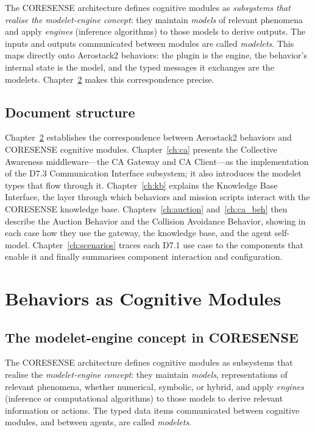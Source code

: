 \documentclass[deliverable]{csreport}
\begin{document}
The CORESENSE architecture defines cognitive modules as \emph{subsystems that realise the modelet-engine concept}: they maintain \emph{models} of relevant phenomena and apply \emph{engines} (inference algorithms) to those models to derive outputs. The inputs and outputs communicated between modules are called \emph{modelets}. This maps directly onto Aerostack2 behaviors: the plugin is the engine, the behavior's internal state is the model, and the typed messages it exchanges are the modelets. Chapter~\ref{ch:cognitive} makes this correspondence precise.

\section{Document structure}

Chapter~\ref{ch:cognitive} establishes the correspondence between Aerostack2 behaviors and CORESENSE cognitive modules. Chapter~\ref{ch:ca} presents the Collective Awareness middleware---the CA Gateway and CA Client---as the implementation of the D7.3 Communication Interface subsystem; it also introduces the modelet types that flow through it. Chapter~\ref{ch:kb} explains the Knowledge Base Interface, the layer through which behaviors and mission scripts interact with the CORESENSE knowledge base. Chapters~\ref{ch:auction} and~\ref{ch:ca_beh} then describe the Auction Behavior and the Collision Avoidance Behavior, showing in each case how they use the gateway, the knowledge base, and the agent self-model. Chapter~\ref{ch:scenarios} traces each D7.1 use case to the components that enable it and finally summarises component interaction and configuration.


\chapter{Behaviors as Cognitive Modules}
\label{ch:cognitive}

\section{The modelet-engine concept in CORESENSE}

The CORESENSE architecture defines cognitive modules as subsystems that realise the \emph{modelet-engine concept}: they maintain \emph{models}, representations of relevant phenomena, whether numerical, symbolic, or hybrid, and apply \emph{engines} (inference or computational algorithms) to those models to derive relevant information or actions. The typed data items communicated between cognitive modules, and between agents, are called \emph{modelets}.
\end{document}
